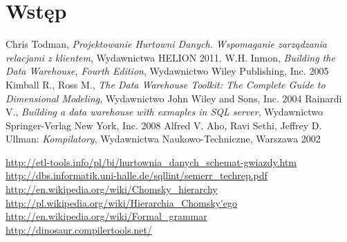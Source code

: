 \documentclass[a4paper,12pt]{ report}
\newcommand*\stdchapter{}
\let\stdchapter\chapter
\renewcommand*\chapter{%
\clearpage\ifodd\value{page}\else\mbox{}\clearpage\fi
\stdchapter}
\begin{document}


\tableofcontents
\setlength{\parskip}{2ex plus 0.5ex minus 0.5ex}


\chapter*{Wstęp}








  


\renewcommand\lstlistlistingname{Listingi kodu}
\lstlistoflistings

\begin{thebibliography}{99}


Chris Todman, \textit{Projektowanie Hurtowni Danych. Wspomaganie zarządzania relacjami z klientem}, Wydawnictwa HELION 2011.
W.H. Inmon, \textit{Building the Data Warehouse, Fourth Edition}, Wydawnictwo Wiley Publishing, Inc. 2005
Kimball R., Ross M., \textit{ The Data Warehouse Toolkit: The Complete Guide to Dimensional Modeling}, Wydawnictwo John Wiley and Sons, Inc. 2004
 Rainardi V.,  \textit{Building a data warehouse with exmaples in SQL server}, Wydawnictwo  Springer-Verlag New York, Inc. 2008
  Alfred V. Aho, Ravi Sethi, Jeffrey D. Ullman: \textit{Kompilatory}, Wydawnictwa Naukowo-Techniczne, Warszawa 2002

   \url{http://etl-tools.info/pl/bi/hurtownia_danych_schemat-gwiazdy.htm}
   \url{http://dbs.informatik.uni-halle.de/sqllint/semerr_techrep.pdf}
   \url{http://en.wikipedia.org/wiki/Chomsky\_hierarchy}
   \url{http://pl.wikipedia.org/wiki/Hierarchia\_Chomsky'ego}
   \url{http://en.wikipedia.org/wiki/Formal_grammar}
  \url{http://dinosaur.compilertools.net/}


\end{thebibliography}
\end{document}
